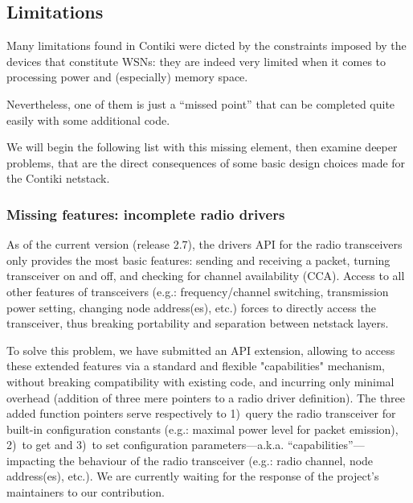 \documentclass[12pt,a4paper]{article}
\begin{document}

\subsection{Limitations}

Many limitations found in Contiki were dicted by the constraints imposed
by the devices that constitute WSNs: they are indeed very limited when
it comes to processing power and (especially) memory space.

Nevertheless, one of them is just a ``missed point'' that can be completed
quite easily with some additional code.

We will begin the following list with this missing element, then examine
deeper problems, that are the direct consequences of some basic design
choices made for the Contiki netstack.


\subsubsection{Missing features: incomplete radio drivers}

As of the current version (release 2.7), the drivers API for the radio
transceivers only provides the most basic features: sending and receiving
a packet, turning transceiver on and off, and checking for channel
availability (CCA). Access to all other features of transceivers (e.g.:
frequency/channel switching, transmission power setting, changing node
address(es), etc.) forces to directly access the transceiver, thus breaking
portability and separation between netstack layers.

To solve this problem, we have submitted an API extension, allowing
to access these extended features via a standard and flexible "capabilities"
mechanism, without breaking compatibility with existing code, and incurring
only minimal overhead (addition of three mere pointers to a radio driver
definition). The three added function pointers serve respectively to
1)~query the radio transceiver for built-in configuration constants
(e.g.: maximal power level for packet emission), 2)~to get and
3)~to set configuration parameters---a.k.a. ``capabilities''---impacting
the behaviour of the radio transceiver (e.g.: radio channel,
node address(es), etc.). We are currently waiting for the
response of the project's maintainers to our contribution.
\end{document}
